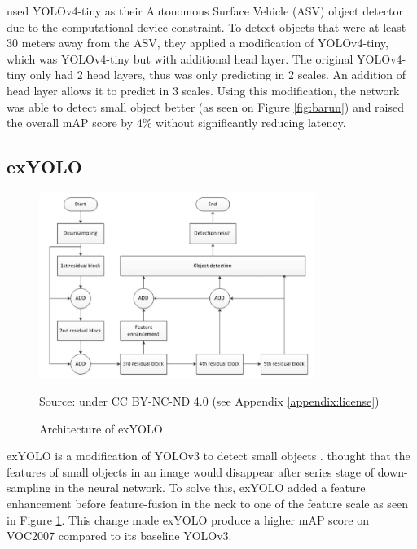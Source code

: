   \textcite{barunastra} used YOLOv4-tiny as their Autonomous Surface Vehicle (ASV) object detector due to the computational
  device constraint.
  To detect objects that were at least 30 meters away from the ASV, they applied a modification of YOLOv4-tiny, which was YOLOv4-tiny
  but with additional head layer. The original YOLOv4-tiny only had 2 head layers, thus was only predicting in 2 scales.
  An addition of head layer allows it to predict in 3 scales. Using this modification, the network was able to detect small object
  better (as seen on Figure \ref{fig:barun}) and raised the overall mAP score by 4\% without significantly reducing latency.




  \subsection{exYOLO}
  \begin{figure}[p]
    \centering
    \includegraphics[width=0.8\textwidth]{figures/exyolo.png}
    \caption*{Source: \textcite{exyolo} under CC BY-NC-ND 4.0 (see Appendix \ref{appendix:license})}
    \caption{Architecture of exYOLO}
    \label{fig:exyolo}
  \end{figure}

  exYOLO is a modification of YOLOv3 to detect small objects \parencite{exyolo}.
  \textcite{exyolo} thought that the features of small objects in an image would disappear
  after series stage of down-sampling in the neural network.
  To solve this, exYOLO added a feature enhancement before feature-fusion in the neck to one of the feature scale as seen in Figure \ref{fig:exyolo}.
  This change made exYOLO produce a higher mAP score on VOC2007 compared to its baseline YOLOv3.

